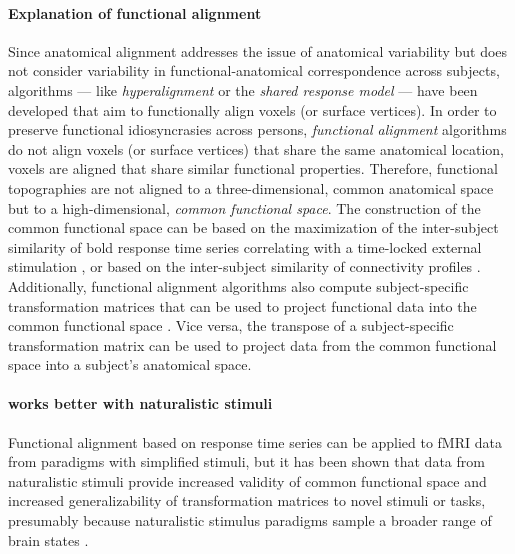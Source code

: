 
\paragraph{Explanation of functional alignment}

Since anatomical alignment addresses the issue of anatomical variability but
does not consider variability in functional-anatomical correspondence across
subjects, algorithms --- like \textit{hyperalignment} \citep{haxby2011common,
guntupalli2016model} or the \textit{shared response model}
\citep{chen2015reduced, zhang2016searchlight} --- have been developed that aim
to functionally align voxels (or surface vertices).
%
In order to preserve functional idiosyncrasies across persons,
\textit{functional alignment} algorithms do not align voxels (or surface
vertices) that share the same anatomical location, voxels are aligned that share
similar functional properties.
%
Therefore, functional topographies are not aligned to a three-dimensional,
common anatomical space but to a high-dimensional, \textit{common functional
space}.
%
The construction of the common functional space can be based on the maximization
of the inter-subject similarity of \ac{bold} response time series correlating
with a time-locked external stimulation \citep{haxby2011common, chen2015reduced,
sabuncu2010function}, or based on the inter-subject similarity of connectivity
profiles \citep{feilong2018reliable, guntupalli2018computational,
nastase2019leveraging}.
%
Additionally, functional alignment algorithms also compute subject-specific
transformation matrices that can be used to project functional data into the
common functional space \citep{haxby2020hyperalignment}.
%
Vice versa, the transpose of a subject-specific transformation matrix can be
used to project data from the common functional space into a subject's
anatomical space.


\paragraph{works better with naturalistic stimuli}


%
Functional alignment based on response time series can be applied to fMRI data
from paradigms with simplified stimuli, but it has been shown that data from
naturalistic stimuli provide increased validity of common functional space and
increased generalizability of transformation matrices to novel stimuli or tasks,
presumably because naturalistic stimulus paradigms sample a broader range of
brain states \citep{haxby2011common, guntupalli2016model}.

